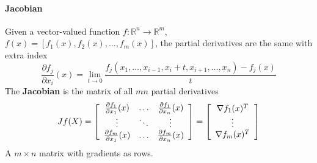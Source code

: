 \documentclass[10pt]{report}
\begin{document}
\paragraph{Jacobian} Given a vector-valued function $f:\mathbb{R}^n\rightarrow \mathbb{R}^m$, $f(x) = [f_1(x), f_2(x),\ldots,f_m(x)]$, the partial derivatives are the same with extra index $$\frac{\partial f_j}{\partial x_i}(x) = \lim_{t\rightarrow 0}\frac{f_j(x_1,\ldots,x_{i-1},x_i+t,x_{i+1},\ldots,x_n) - f_j(x)}{t}$$
The \textbf{Jacobian} is the matrix of all $mn$ partial derivatives
$$Jf(X) = \left[ \begin{array}{c c c}
\frac{\partial f_1}{\partial x_1}(x) & \ldots & \frac{\partial f_1}{\partial x_n}(x)\\
\vdots&\ddots&\vdots\\
\frac{\partial f_m}{\partial x_1}(x) & \ldots & \frac{\partial f_m}{\partial x_n}(x)\\
\end{array}\right] = \left[\begin{array}{c}
\nabla f_1(x)^T\\\vdots\\\nabla f_m(x)^T
\end{array}\right]$$
A $m\times n$ matrix with gradients as rows.
\end{document}
